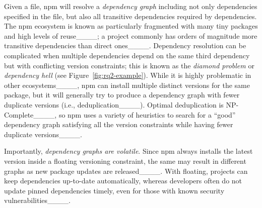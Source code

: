 Given a  file, npm will resolve a \textit{dependency graph} including not only dependencies specified in the  file, but also all transitive dependencies required by dependencies.
The npm ecosystem is known as particularly fragmented with many tiny packages and high levels of reuse____; a project commonly has orders of magnitude more transitive dependencies than direct ones____.
Dependency resolution can be complicated when multiple dependencies depend on the same third dependency but with conflicting version constraints; this is known as the \textit{diamond problem} or \textit{dependency hell} (see Figure~\ref{fig:rq2-example}). 
While it is highly problematic in other ecosystems____, npm can install multiple distinct versions for the same package, but it will generally try to produce a dependency graph with fewer duplicate versions (i.e., deduplication____). 
Optimal deduplication is NP-Complete____, so npm uses a variety of heuristics to search for a ``good'' dependency graph satisfying all the version constraints while having fewer duplicate versions____. 

Importantly, \emph{dependency graphs are volatile}. 
Since npm always installs the latest version inside a floating versioning constraint, the same  may result in different graphs as new package updates are released____.
With floating, projects can keep dependencies up-to-date automatically, whereas developers often do not update pinned dependencies timely, even for those with known security vulnerabilities____.

